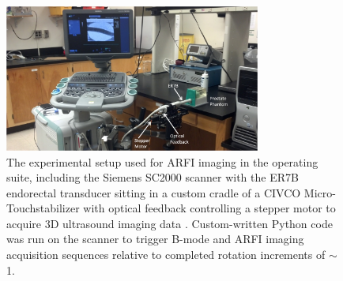 \begin{figure}[htb!]
\centering
\includegraphics[width=0.75\textwidth]{figs/setup_annotated.png}
\caption{The experimental setup used for ARFI imaging in the operating suite,
    including the Siemens SC2000 scanner with the ER7B endorectal transducer
    sitting in a custom cradle of a CIVCO Micro-Touch\texttrademark stabilizer
    with optical feedback controlling a stepper motor to acquire 3D ultrasound
    imaging data \invivo.  Custom-written Python code was run on the scanner to
    trigger B-mode and ARFI imaging acquisition sequences relative to completed
    rotation increments of $\sim$1\degree.}
\label{fig:setup_annotated} 
\end{figure}
